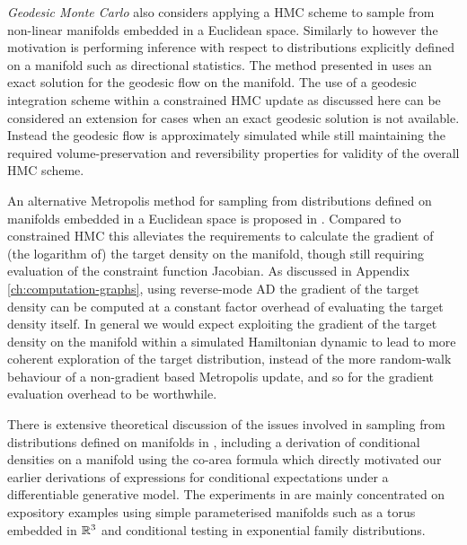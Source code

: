 \emph{Geodesic Monte Carlo} \citep{byrne2013geodesic} also considers applying a \ac{HMC} scheme to sample from non-linear manifolds embedded in a Euclidean space. Similarly to \citep{brubaker2012family} however the motivation is performing inference with respect to distributions explicitly defined on a manifold such as directional statistics. The method presented in \citep{byrne2013geodesic} uses an exact solution for the geodesic flow on the manifold. The use of a geodesic integration scheme within a constrained \ac{HMC} update as discussed here can be considered an extension for cases when an exact geodesic solution is not available. Instead the geodesic flow is approximately simulated while still maintaining the required volume-preservation and reversibility properties for validity of the overall \ac{HMC} scheme.

An alternative Metropolis method for sampling from distributions defi\-ned on manifolds embedded in a Euclidean space is proposed in \citep{zappa2017monte}. Compared to constrained \ac{HMC} this alleviates the requirements to calculate the gradient of (the logarithm of) the target density on the manifold, though still requiring evaluation of the constraint function Jacobian. As discussed in Appendix \ref{ch:computation-graphs}, using reverse-mode \ac{AD} the gradient of the target density can be computed at a constant factor overhead of evaluating the target density itself. In general we would expect exploiting the gradient of the target density on the manifold within a simulated Hamiltonian dynamic to lead to more coherent exploration of the target distribution, instead of the more random-walk behaviour of a non-gradient based Metropolis update, and so for the gradient evaluation overhead to be worthwhile.

There is extensive theoretical discussion of the issues involved in samp\-ling from distributions defined on manifolds in \citep{diaconis2013sampling}, including a derivation of conditional densities on a manifold using the co-area formula which directly motivated our earlier derivations of expressions for conditional expectations under a differentiable generative model. The experiments in \citep{diaconis2013sampling} are mainly concentrated on expository examples using simple parameterised manifolds such as a torus embedded in $\mathbb{R}^3$ and conditional testing in exponential family distributions. 



